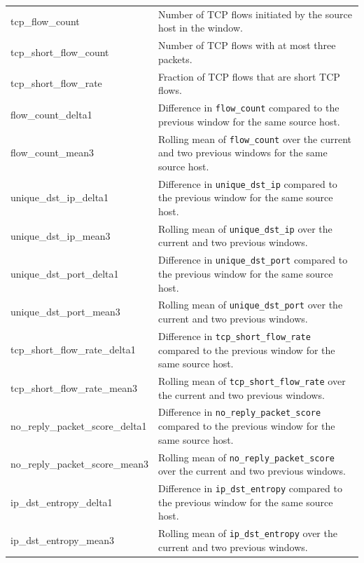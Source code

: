 \begin{longtable}{
    >{\ttfamily\raggedright\arraybackslash}p{}
    >{\raggedright\arraybackslash}p{}
}
tcp\_flow\_count & Number of TCP flows initiated by the source host in the window. \\
tcp\_short\_flow\_count & Number of TCP flows with at most three packets. \\
tcp\_short\_flow\_rate & Fraction of TCP flows that are short TCP flows. \\

flow\_count\_delta1 & Difference in \texttt{flow\_count} compared to the previous window for the same source host. \\
flow\_count\_mean3 & Rolling mean of \texttt{flow\_count} over the current and two previous windows for the same source host. \\

unique\_dst\_ip\_delta1 & Difference in \texttt{unique\_dst\_ip} compared to the previous window for the same source host. \\
unique\_dst\_ip\_mean3 & Rolling mean of \texttt{unique\_dst\_ip} over the current and two previous windows. \\

unique\_dst\_port\_delta1 & Difference in \texttt{unique\_dst\_port} compared to the previous window for the same source host. \\
unique\_dst\_port\_mean3 & Rolling mean of \texttt{unique\_dst\_port} over the current and two previous windows. \\

tcp\_short\_flow\_rate\_delta1 & Difference in \texttt{tcp\_short\_flow\_rate} compared to the previous window for the same source host. \\
tcp\_short\_flow\_rate\_mean3 & Rolling mean of \texttt{tcp\_short\_flow\_rate} over the current and two previous windows. \\

no\_reply\_packet\_score\_delta1 & Difference in \texttt{no\_reply\_packet\_score} compared to the previous window for the same source host. \\
no\_reply\_packet\_score\_mean3 & Rolling mean of \texttt{no\_reply\_packet\_score} over the current and two previous windows. \\

ip\_dst\_entropy\_delta1 & Difference in \texttt{ip\_dst\_entropy} compared to the previous window for the same source host. \\
ip\_dst\_entropy\_mean3 & Rolling mean of \texttt{ip\_dst\_entropy} over the current and two previous windows. \\


\end{longtable}
